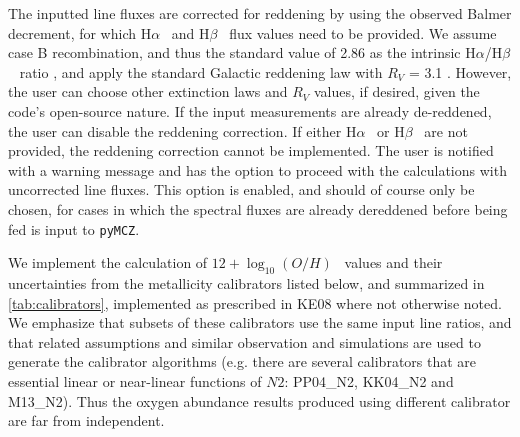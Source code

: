 \documentclass{emulateapj}
\newcommand{\oxabinline}{\ensuremath{12 + \log_{10}(O/H)}}
\newcommand{\ha}{\ensuremath{\mathrm{H}\alpha}}
\newcommand{\hb}{\ensuremath{\mathrm{H}\beta}}
\begin{document}
The inputted line fluxes are corrected for reddening by using the
observed Balmer decrement, for which \ha~ and \hb~ flux values need to
be provided. We assume case B recombination, and thus the standard
value of 2.86 as the intrinsic \ha/\hb~ ratio \citep{osterbrock89},
and apply the standard Galactic reddening law with $R_V$ = 3.1
\citep{cardelli89}. However, the user can choose other extinction laws
and $R_V$ values, if desired, given the code's open-source nature. If
the input measurements are already de-reddened, the user can disable
the reddening correction. If either \ha~ or \hb~ are not provided, the
reddening correction cannot be implemented. The user is notified with
a warning message and has the option to proceed with the calculations
with uncorrected line fluxes. This option is enabled, and should of
course only be chosen, for cases in which the spectral fluxes are
already dereddened before being fed is input to \verb=pyMCZ=.

We implement the calculation of \oxabinline~ values and their
uncertainties from the metallicity calibrators listed below, and
summarized in \autoref{tab:calibrators}, implemented as prescribed
in KE08 where not otherwise noted. We emphasize that subsets of these
calibrators use the same input line ratios, and that related
assumptions and similar observation and simulations are used to
generate the calibrator algorithms (e.g. there are several calibrators
that are essential linear or near-linear functions of $N2$: PP04\_N2,
KK04\_N2 and M13\_N2). Thus the oxygen abundance results produced
using different calibrator are far from independent.
\end{document}
